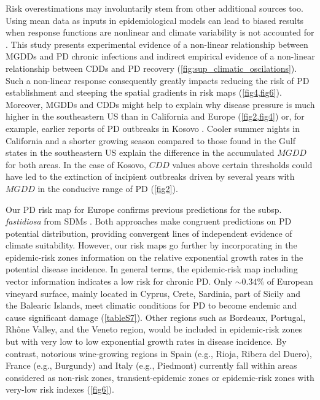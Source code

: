     Risk overestimations may involuntarily stem from other additional sources
    too. Using mean data as inputs in epidemiological models can lead to biased
    results when response functions are nonlinear and climate variability is
    not accounted for \cite{Scherm1994}. This study presents experimental
    evidence of a non-linear relationship between MGDDs and PD chronic
    infections and indirect empirical evidence of a non-linear relationship
    between CDDs and PD recovery (\cref{fig:sup_climatic_oscilations}). Such a
    non-linear response consequently greatly impacts reducing the risk of PD
    establishment and steeping the spatial gradients in risk maps
    (\cref{fig4,fig6}). Moreover, MGDDs and CDDs might help to explain why
    disease pressure is much higher in the southeastern US than in California
    and Europe (\cref{fig2,fig4}) or, for example, earlier reports of PD
    outbreaks in Kosovo  \cite{Berisha1998}. Cooler summer nights in California
    and a shorter growing season compared to those found in the Gulf states in
    the southeastern US explain the difference in the accumulated $MGDD$ for
    both areas. In the case of Kosovo, $CDD$ values above certain thresholds
    could have led to the extinction of incipient outbreaks driven by several
    years with $MGDD$ in the conducive range of PD (\cref{fig2}).

    Our PD risk map for Europe confirms previous predictions for the subsp.
    \textit{fastidiosa} from SDMs \cite{Bragard2019}. Both approaches make
    congruent predictions on PD potential distribution, providing convergent
    lines
    of independent evidence of climate suitability. However, our risk maps go
    further by incorporating in the epidemic-risk zones information on the
    relative
    exponential growth rates in the potential disease incidence. In general
    terms,
    the epidemic-risk map including vector information indicates a low risk for
    chronic PD. Only $\sim 0.34\%$ of European vineyard surface, mainly located
    in
    Cyprus, Crete, Sardinia, part of Sicily and the Balearic Islands, meet
    climatic
    conditions for PD to become endemic and cause significant damage
    (\cref{tableS7}). Other regions such as Bordeaux,
    Portugal,
    Rh\^one Valley, and the Veneto region, would be included in epidemic-risk
    zones
    but with very low to low exponential growth rates in disease incidence. By
    contrast, notorious wine-growing regions in Spain (e.g., Rioja, Ribera del
    Duero), France (e.g., Burgundy) and Italy (e.g., Piedmont) currently fall
    within areas considered as non-risk zones, transient-epidemic zones or
    epidemic-risk zones with very-low risk indexes (\cref{fig6}).

